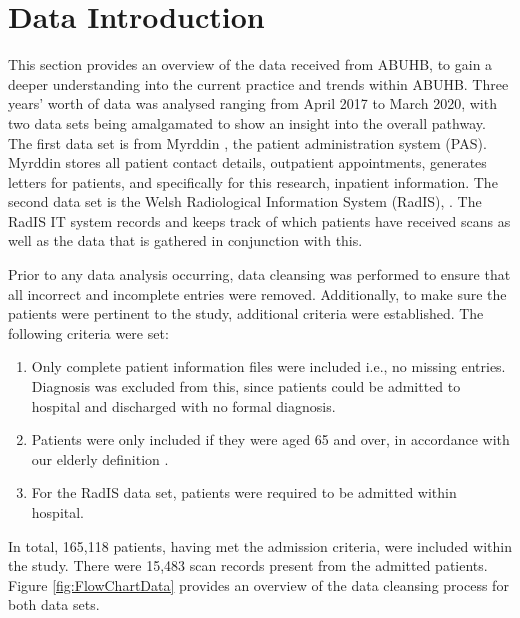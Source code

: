 \documentclass[../thesis.tex]{subfiles}
\begin{document}
\section{Data Introduction} \label{sec:dataintroduction}
This section provides an overview of the data received from ABUHB, to gain a deeper understanding into the current practice and trends within ABUHB. Three years' worth of data was analysed ranging from April 2017 to March 2020, with two data sets being amalgamated to show an insight into the overall pathway. The first data set is from Myrddin \cite{WAO2018}, the patient administration system (PAS). Myrddin stores all patient contact details, outpatient appointments, generates letters for patients, and specifically for this research, inpatient information. The second data set is the Welsh Radiological Information System (RadIS), \cite{WAO2018}. The RadIS IT system records and keeps track of which patients have received scans as well as the data that is gathered in conjunction with this.

Prior to any data analysis occurring, data cleansing was performed to ensure that all incorrect and incomplete entries were removed. Additionally, to make sure the patients were pertinent to the study, additional criteria were established. The following criteria were set:
\begin{enumerate}
    \item Only complete patient information files were included i.e., no missing entries. Diagnosis was excluded from this, since patients could be admitted to hospital and discharged with no formal diagnosis.
    \item Patients were only included if they were aged 65 and over, in accordance with our elderly definition \cite{OECD}.
    \item For the RadIS data set, patients were required to be admitted within hospital.
\end{enumerate}

In total, 165,118 patients, having met the admission criteria, were included within the study. There were 15,483 scan records present from the admitted patients. Figure \ref{fig:FlowChartData} provides an overview of the data cleansing process for both data sets.
\end{document}
